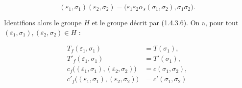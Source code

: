 \begin{equation}
  (\varepsilon_1,\sigma_1)(\varepsilon_2,\sigma_2)
  =\bigl(\varepsilon_1\varepsilon_2
    \alpha_s(\sigma_1,\sigma_2),\sigma_1\sigma_2\bigr).
  \tag{1.4.3.6}
\end{equation}

Identifions alors le groupe $H$ et le groupe décrit par (1.4.3.6). On
a, pour tout $(\varepsilon_1,\sigma_1),(\varepsilon_2,\sigma_2)\in H$ :

\begin{equation}
  \begin{aligned}
    T_f(\varepsilon_1,\sigma_1)&=T(\sigma_1),\\
    T'_f(\varepsilon_1,\sigma_1)&=T'(\sigma_1),\\
    c_f\bigl((\varepsilon_1,\sigma_1),(\varepsilon_2,\sigma_2)\bigr)
      &=c(\sigma_1,\sigma_2),\\
    c'_f\bigl((\varepsilon_1,\sigma_1),(\varepsilon_2,\sigma_2)\bigr)
      &=c'(\sigma_1,\sigma_2)
  \end{aligned}
  \tag{1.4.3.7}
\end{equation}
